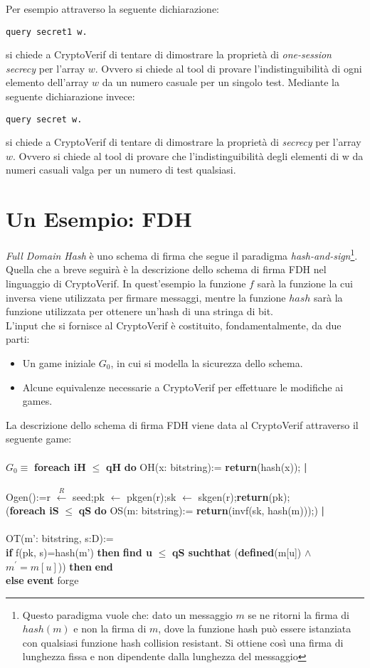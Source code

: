 \documentclass[a4paper,openright,twoside,12pt]{report}
\newcommand{\foreach}[2]{\textbf{foreach #1} $\leq$ \textbf{#2} \textbf{do}}
\newcommand{\return}[1]{\textbf{return}(#1);}
\newcommand{\pipe}{ \textbf{|} \\ \\}
\newcommand{\setR}[2]{#1 $\xleftarrow{R}$ #2;}
\newcommand{\set}[2]{#1 $\leftarrow$ #2;}
\newcommand{\ifthen}[2]{\textbf{if} #1 \textbf{then} #2}
\newcommand{\find}[6]{\textbf{find #1} $\leq$ \textbf{#2 suchthat} (\textbf{defined}(#3) $\wedge$ #4)) \textbf{then} #5 \\ \textbf{else} #6}
\newcommand{\event}{\textbf{event}}
\newcommand{\myend}{\textbf{end}}
\begin{document}
Per esempio attraverso la seguente dichiarazione:
\begin{verbatim}
query secret1 w. 
\end{verbatim}
si chiede a CryptoVerif di tentare di dimostrare la propriet\`a di \emph{one-session secrecy} per l'array $w$. 
Ovvero si chiede al tool di provare l'indistinguibilit\`a di ogni elemento dell'array $w$ da un numero casuale per un singolo test. 
Mediante la seguente dichiarazione invece:
\begin{verbatim}
query secret w. 
\end{verbatim}
si chiede a CryptoVerif di tentare di dimostrare la propriet\`a di \emph{secrecy} per l'array $w$. Ovvero si chiede al tool di provare che l'indistinguibilit\`a degli elementi di w da numeri casuali 
valga per un numero di test qualsiasi.
\section{Un Esempio: FDH}
\emph{Full Domain Hash} \`e uno schema di firma che segue il paradigma \emph{hash-and-sign}\footnote{Questo paradigma vuole che: dato un messaggio $m$ se ne ritorni 
la firma di $hash(m)$ e non la firma di $m$, dove la funzione hash pu\`o essere istanziata con qualsiasi funzione hash collision resistant. 
Si ottiene cos\`i una firma di lunghezza fissa e non dipendente dalla lunghezza del messaggio}. 
Quella che a breve seguir\`a \`e la descrizione dello schema di firma FDH nel linguaggio di CryptoVerif. In quest'esempio la funzione $f$ sar\`a la funzione la cui inversa
viene utilizzata per firmare messaggi, mentre la funzione $hash$ sar\`a la funzione utilizzata per ottenere un'hash di una stringa di bit.\\
L'input che si fornisce al CryptoVerif \`e costituito, fondamentalmente, da due parti: 
\begin{itemize}
 \item Un game iniziale $G_0$, in cui si modella la sicurezza dello schema.
 \item Alcune equivalenze necessarie a CryptoVerif per effettuare le modifiche ai games. 
\end{itemize}
La descrizione dello schema di firma FDH viene data al CryptoVerif attraverso il seguente game:\\ \\

$G_0 \equiv$ \foreach{iH}{qH} OH(x: bitstring):= \return{hash(x)}\pipe Ogen():=\setR{r}{seed}\set{pk}{pkgen(r)}\set{sk}{skgen(r)}\return{pk}\\
	(\foreach{iS}{qS} OS(m: bitstring):= \return{invf(sk, hash(m))})\pipe
	OT(m': bitstring, s:D):=\\ \ifthen{f(pk, s)=hash(m')}{\find{u}{qS}{m[u]} {$m^{'}=m[u]$} {\myend} {\event} forge}
	\\
\end{document}
